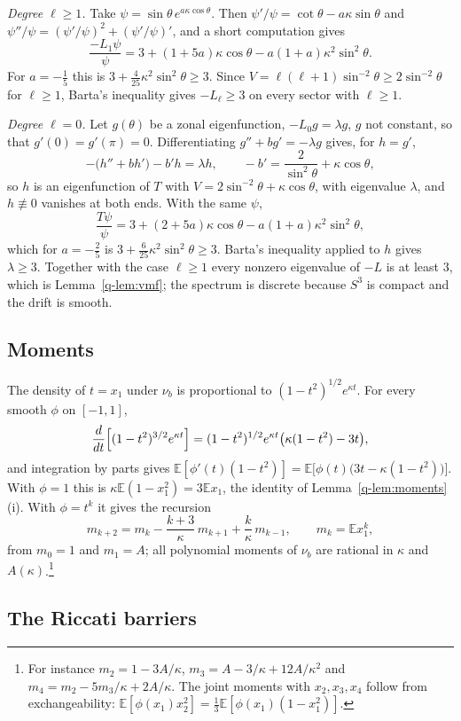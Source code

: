 \documentclass[aps,prd,twocolumn,superscriptaddress,nofootinbib,longbibliography,floatfix,amsmath,amssymb,10pt]{revtex4-2}
\theoremstyle{definition}
\theoremstyle{remark}
\newcommand{\E}{\mathbb{E}}
\begin{document}
\emph{Degree $\ell\ge1$.} Take $\psi=\sin\theta\,e^{a\kappa\cos\theta}$. Then
$\psi'/\psi=\cot\theta-a\kappa\sin\theta$ and
$\psi''/\psi=(\psi'/\psi)^2+(\psi'/\psi)'$, and a short computation gives
\[
\frac{-L_1\psi}\psi=3+(1+5a)\kappa\cos\theta-a(1+a)\kappa^2\sin^2\theta .
\]
For $a=-\frac15$ this is $3+\frac4{25}\kappa^2\sin^2\theta\ge3$. Since
$V=\ell(\ell+1)\sin^{-2}\theta\ge2\sin^{-2}\theta$ for $\ell\ge1$, Barta's
inequality gives $-L_\ell\ge3$ on every sector with $\ell\ge1$.

\emph{Degree $\ell=0$.} Let $g(\theta)$ be a zonal eigenfunction,
$-L_0g=\lambda g$, $g$ not constant, so that $g'(0)=g'(\pi)=0$. Differentiating
$g''+bg'=-\lambda g$ gives, for $h=g'$,
\[
-\bigl(h''+bh'\bigr)-b'h=\lambda h,\qquad -b'=\frac2{\sin^2\theta}+\kappa
\cos\theta,
\]
so $h$ is an eigenfunction of $T$ with $V=2\sin^{-2}\theta+\kappa\cos\theta$,
with eigenvalue $\lambda$, and $h\not\equiv0$ vanishes at both ends. With the
same $\psi$,
\[
\frac{T\psi}\psi=3+(2+5a)\kappa\cos\theta-a(1+a)\kappa^2\sin^2\theta,
\]
which for $a=-\frac25$ is $3+\frac6{25}\kappa^2\sin^2\theta\ge3$. Barta's
inequality applied to $h$ gives $\lambda\ge3$. Together with the case
$\ell\ge1$ every nonzero eigenvalue of $-L$ is at least $3$, which is
Lemma~\ref{q-lem:vmf}; the spectrum is discrete because $S^3$ is compact and
the drift is smooth.

\subsection{Moments}

The density of $t=x_1$ under $\nu_b$ is proportional to $(1-t^2)^{1/2}e^{
\kappa t}$. For every smooth $\phi$ on $[-1,1]$,
\[
\frac d{dt}\Bigl[(1-t^2)^{3/2}e^{\kappa t}\Bigr]=(1-t^2)^{1/2}e^{\kappa t}
\bigl(\kappa(1-t^2)-3t\bigr),
\]
and integration by parts gives $\E[\phi'(t)(1-t^2)]=\E\bigl[\phi(t)\bigl(3t-
\kappa(1-t^2)\bigr)\bigr]$. With $\phi=1$ this is $\kappa\E(1-x_1^2)=3\E x_1$,
the identity of Lemma~\ref{q-lem:moments}(i). With $\phi=t^k$ it gives the
recursion
\[
m_{k+2}=m_k-\frac{k+3}\kappa\,m_{k+1}+\frac k\kappa\,m_{k-1},\qquad m_k=\E
x_1^k,
\]
from $m_0=1$ and $m_1=A$; all polynomial moments of $\nu_b$ are rational in
$\kappa$ and $A(\kappa)$.\footnote{For instance $m_2=1-3A/\kappa$,
$m_3=A-3/\kappa+12A/\kappa^2$ and $m_4=m_2-5m_3/\kappa+2A/\kappa$. The joint moments
with $x_2,x_3,x_4$ follow from exchangeability:
$\E[\phi(x_1)x_2^2]=\frac13\E[\phi(x_1)(1-x_1^2)]$.}

\subsection{The Riccati barriers}
\end{document}
